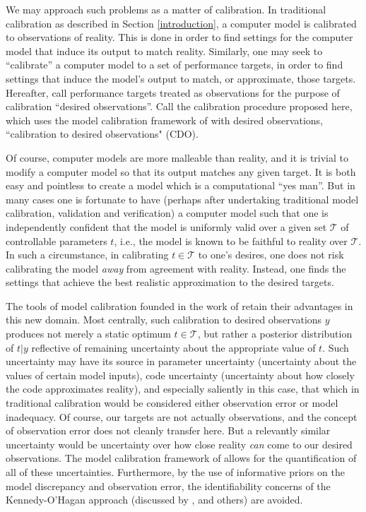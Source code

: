 \documentclass{article}
\begin{document}
We may approach such problems as a matter of calibration. In traditional calibration as described in Section \ref{introduction}, a computer model is calibrated to observations of reality. This is done in order to find settings for the computer model that induce its output to match reality. Similarly, one may seek to ``calibrate'' a computer model to a set of performance targets, in order to find settings that induce the model's output to match, or approximate, those targets. Hereafter, call performance targets treated as observations for the purpose of calibration ``desired observations''. Call the calibration procedure proposed here, which uses the model calibration framework of \cite{Kennedy2001} with desired observations, ``calibration to desired observations" (CDO). 

Of course, computer models are more malleable than reality, and it is trivial to modify a computer model so that its output matches any given target. It is both easy and pointless to create a model which is a computational ``yes man''. But in many cases one is fortunate to have (perhaps after undertaking traditional model calibration, validation and verification) a computer model such that one is independently confident that the model is uniformly valid over a given set $\mathcal T$ of controllable parameters $t$, i.e., the model is known to be faithful to reality over $\mathcal T$. In such a circumstance, in calibrating $t\in\mathcal T$ to one's desires, one does not risk calibrating the model \emph{away} from agreement with reality. 
Instead, one finds the settings that achieve the best realistic approximation to the desired targets.

The tools of model calibration founded in the work of \cite{Kennedy2001} retain their advantages in this new domain.
Most centrally, such calibration to desired observations $y$ produces not merely a static optimum $t\in\mathcal T$, but rather a posterior distribution of $t|y$ reflective of remaining uncertainty about the appropriate value of $t$. 
Such uncertainty may have its source in parameter uncertainty (uncertainty about the values of certain model inputs), code uncertainty (uncertainty about how closely the code approximates reality), and especially saliently in this case, that which in traditional calibration would be considered either observation error or model inadequacy. 
Of course, our targets are not actually observations, and the concept of observation error does not cleanly transfer here. 
But a relevantly similar uncertainty would be uncertainty over how close reality \emph{can} come to our desired observations. 
The model calibration framework of \cite{Kennedy2001} allows for the quantification of all of these uncertainties. Furthermore, by the use of informative priors on the model discrepancy and observation error, the identifiability concerns of the Kennedy-O'Hagan approach (discussed by \cite{Bayarri2007}, \cite{Tuo2016} and others) are avoided.
\end{document}
